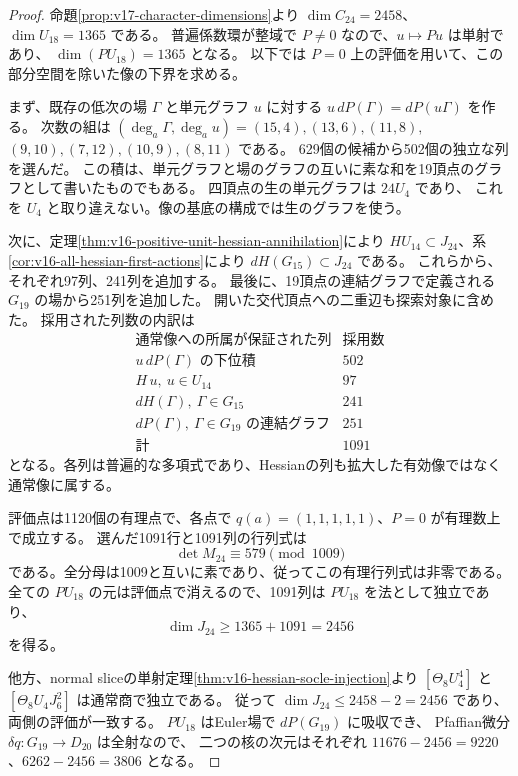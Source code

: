 \documentclass[a4paper,11pt]{ltjsarticle}
\theoremstyle{definition}
\begin{document}
\begin{proof}
命題\ref{prop:v17-character-dimensions}より
$\dim C_{24}=2458$、$\dim U_{18}=1365$ である。
普遍係数環が整域で $P\neq0$ なので、$u\mapsto Pu$ は単射であり、
$\dim(PU_{18})=1365$ となる。
以下では $P=0$ 上の評価を用いて、この部分空間を除いた像の下界を求める。

まず、既存の低次の場 $\Gamma$ と単元グラフ $u$ に対する
$u\,dP(\Gamma)=dP(u\Gamma)$ を作る。
次数の組は $(\deg_a\Gamma,\deg_a u)=(15,4),(13,6),(11,8),$
$(9,10),(7,12),(10,9),(8,11)$ である。
629個の候補から502個の独立な列を選んだ。
この積は、単元グラフと場のグラフの互いに素な和を19頂点のグラフとして書いたものでもある。
四頂点の生の単元グラフは $24U_4$ であり、
これを $U_4$ と取り違えない。像の基底の構成では生のグラフを使う。

次に、定理\ref{thm:v16-positive-unit-hessian-annihilation}により
$HU_{14}\subset J_{24}$、系\ref{cor:v16-all-hessian-first-actions}により
$dH(G_{15})\subset J_{24}$ である。
これらから、それぞれ97列、241列を追加する。
最後に、19頂点の連結グラフで定義される $G_{19}$ の場から251列を追加した。
開いた交代頂点への二重辺も探索対象に含めた。
採用された列数の内訳は
\[
 \begin{array}{c|r}
 \text{通常像への所属が保証された列}&\text{採用数}\\\hline
 u\,dP(\Gamma)\text{ の下位積}&502\\
 H\,u,\ u\in U_{14}&97\\
 dH(\Gamma),\ \Gamma\in G_{15}&241\\
 dP(\Gamma),\ \Gamma\in G_{19}\text{ の連結グラフ}&251\\\hline
 \text{計}&1091
 \end{array}
\]
となる。各列は普遍的な多項式であり、Hessianの列も拡大した有効像ではなく通常像に属する。

評価点は1120個の有理点で、各点で $q(a)=(1,1,1,1,1)$、$P=0$ が有理数上で成立する。
選んだ1091行と1091列の行列式は
\[
 \det M_{24}\equiv579\pmod{1009}
\]
である。全分母は1009と互いに素であり、従ってこの有理行列式は非零である。
全ての $PU_{18}$ の元は評価点で消えるので、1091列は $PU_{18}$ を法として独立であり、
\[
 \dim J_{24}\ge1365+1091=2456
\]
を得る。

他方、normal sliceの単射定理\ref{thm:v16-hessian-socle-injection}より
$[\Theta_8U_4^4]$ と $[\Theta_8U_4J_6^2]$ は通常商で独立である。
従って $\dim J_{24}\le2458-2=2456$ であり、両側の評価が一致する。
$PU_{18}$ はEuler場で $dP(G_{19})$ に吸収でき、
Pfaffian微分 $\delta q:G_{19}\to D_{20}$ は全射なので、
二つの核の次元はそれぞれ $11676-2456=9220$、$6262-2456=3806$ となる。
\end{proof}
\end{document}
